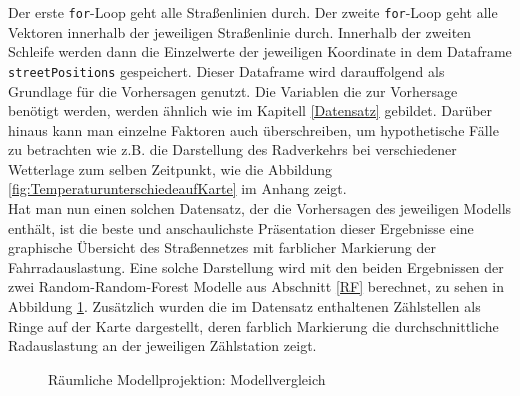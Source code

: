 \documentclass[a4paper,12pt]{thesis}
\begin{document}
Der erste \lstinline|for|-Loop geht alle Straßenlinien durch. Der zweite \lstinline|for|-Loop geht alle Vektoren innerhalb der jeweiligen Straßenlinie durch. Innerhalb der zweiten Schleife werden dann die Einzelwerte der jeweiligen Koordinate in dem Dataframe \lstinline|streetPositions| gespeichert. Dieser Dataframe wird darauffolgend als Grundlage für die Vorhersagen genutzt. Die Variablen die zur Vorhersage benötigt werden, werden ähnlich wie im Kapitell \ref{Datensatz} gebildet. Darüber hinaus kann man einzelne Faktoren auch überschreiben, um hypothetische Fälle zu betrachten wie z.B. die Darstellung des Radverkehrs bei verschiedener Wetterlage zum selben Zeitpunkt, wie die Abbildung \ref{fig:TemperaturunterschiedeaufKarte} im Anhang zeigt.\\
Hat man nun einen solchen Datensatz, der die Vorhersagen des jeweiligen Modells enthält, ist die beste und anschaulichste Präsentation dieser Ergebnisse eine graphische Übersicht des Straßennetzes mit farblicher Markierung der Fahrradauslastung. Eine solche Darstellung wird mit den beiden Ergebnissen der zwei Random-Random-Forest Modelle aus Abschnitt \ref{RF} berechnet, zu sehen in Abbildung \ref{fig:MunsterRing}. Zusätzlich wurden die im Datensatz enthaltenen Zählstellen als Ringe auf der Karte dargestellt, deren farblich Markierung die durchschnittliche Radauslastung an der jeweiligen Zählstation zeigt.

\begin{figure}%
	\centering

	\caption{Räumliche Modellprojektion: Modellvergleich}%
	\label{fig:MunsterRing}%
\end{figure}
\end{document}
